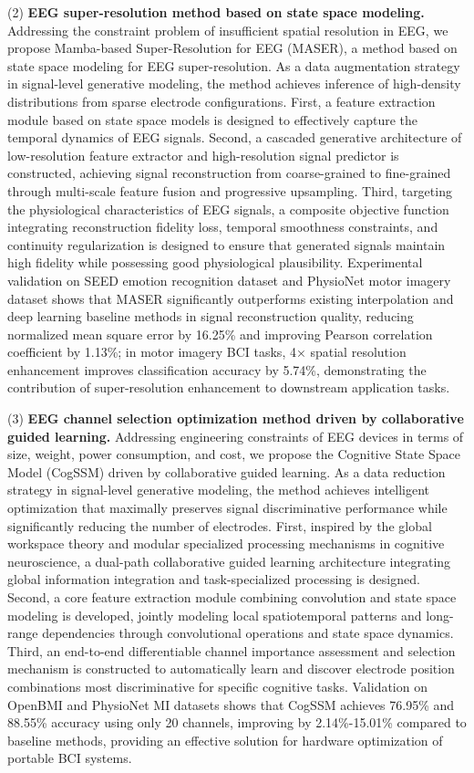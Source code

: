 \begin{eabstract}
(2) \textbf{EEG super-resolution method based on state space modeling.} Addressing the constraint problem of insufficient spatial resolution in EEG, we propose Mamba-based Super-Resolution for EEG (MASER), a method based on state space modeling for EEG super-resolution. As a data augmentation strategy in signal-level generative modeling, the method achieves inference of high-density distributions from sparse electrode configurations. First, a feature extraction module based on state space models is designed to effectively capture the temporal dynamics of EEG signals. Second, a cascaded generative architecture of low-resolution feature extractor and high-resolution signal predictor is constructed, achieving signal reconstruction from coarse-grained to fine-grained through multi-scale feature fusion and progressive upsampling. Third, targeting the physiological characteristics of EEG signals, a composite objective function integrating reconstruction fidelity loss, temporal smoothness constraints, and continuity regularization is designed to ensure that generated signals maintain high fidelity while possessing good physiological plausibility. Experimental validation on SEED emotion recognition dataset and PhysioNet motor imagery dataset shows that MASER significantly outperforms existing interpolation and deep learning baseline methods in signal reconstruction quality, reducing normalized mean square error by 16.25\% and improving Pearson correlation coefficient by 1.13\%; in motor imagery BCI tasks, 4× spatial resolution enhancement improves classification accuracy by 5.74\%, demonstrating the contribution of super-resolution enhancement to downstream application tasks.

(3) \textbf{EEG channel selection optimization method driven by collaborative guided learning.} Addressing engineering constraints of EEG devices in terms of size, weight, power consumption, and cost, we propose the Cognitive State Space Model (CogSSM) driven by collaborative guided learning. As a data reduction strategy in signal-level generative modeling, the method achieves intelligent optimization that maximally preserves signal discriminative performance while significantly reducing the number of electrodes. First, inspired by the global workspace theory and modular specialized processing mechanisms in cognitive neuroscience, a dual-path collaborative guided learning architecture integrating global information integration and task-specialized processing is designed. Second, a core feature extraction module combining convolution and state space modeling is developed, jointly modeling local spatiotemporal patterns and long-range dependencies through convolutional operations and state space dynamics. Third, an end-to-end differentiable channel importance assessment and selection mechanism is constructed to automatically learn and discover electrode position combinations most discriminative for specific cognitive tasks. Validation on OpenBMI and PhysioNet MI datasets shows that CogSSM achieves 76.95\% and 88.55\% accuracy using only 20 channels, improving by 2.14\%-15.01\% compared to baseline methods, providing an effective solution for hardware optimization of portable BCI systems.


\end{eabstract}
